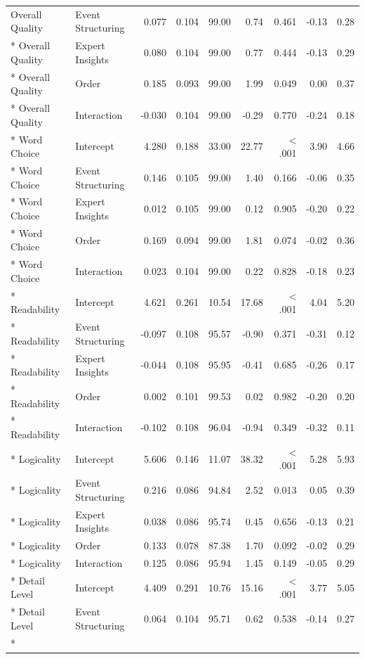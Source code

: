 \begin{longtable}{l l r r r r r r r}
Overall Quality & Event Structuring & 0.077 & 0.104 & 99.00 & 0.74 & 0.461 & -0.13 & 0.28\\*
Overall Quality & Expert Insights & 0.080 & 0.104 & 99.00 & 0.77 & 0.444 & -0.13 & 0.29\\*
Overall Quality & Order & 0.185 & 0.093 & 99.00 & 1.99 & 0.049 & 0.00 & 0.37\\*
Overall Quality & Interaction & -0.030 & 0.104 & 99.00 & -0.29 & 0.770 & -0.24 & 0.18\\*
Word Choice & Intercept & 4.280 & 0.188 & 33.00 & 22.77 & < .001 & 3.90 & 4.66\\*
Word Choice & Event Structuring & 0.146 & 0.105 & 99.00 & 1.40 & 0.166 & -0.06 & 0.35\\*
Word Choice & Expert Insights & 0.012 & 0.105 & 99.00 & 0.12 & 0.905 & -0.20 & 0.22\\*
Word Choice & Order & 0.169 & 0.094 & 99.00 & 1.81 & 0.074 & -0.02 & 0.36\\*
Word Choice & Interaction & 0.023 & 0.104 & 99.00 & 0.22 & 0.828 & -0.18 & 0.23\\*
Readability & Intercept & 4.621 & 0.261 & 10.54 & 17.68 & < .001 & 4.04 & 5.20\\*
Readability & Event Structuring & -0.097 & 0.108 & 95.57 & -0.90 & 0.371 & -0.31 & 0.12\\*
Readability & Expert Insights & -0.044 & 0.108 & 95.95 & -0.41 & 0.685 & -0.26 & 0.17\\*
Readability & Order & 0.002 & 0.101 & 99.53 & 0.02 & 0.982 & -0.20 & 0.20\\*
Readability & Interaction & -0.102 & 0.108 & 96.04 & -0.94 & 0.349 & -0.32 & 0.11\\*
Logicality & Intercept & 5.606 & 0.146 & 11.07 & 38.32 & < .001 & 5.28 & 5.93\\*
Logicality & Event Structuring & 0.216 & 0.086 & 94.84 & 2.52 & 0.013 & 0.05 & 0.39\\*
Logicality & Expert Insights & 0.038 & 0.086 & 95.74 & 0.45 & 0.656 & -0.13 & 0.21\\*
Logicality & Order & 0.133 & 0.078 & 87.38 & 1.70 & 0.092 & -0.02 & 0.29\\*
Logicality & Interaction & 0.125 & 0.086 & 95.94 & 1.45 & 0.149 & -0.05 & 0.29\\*
Detail Level & Intercept & 4.409 & 0.291 & 10.76 & 15.16 & < .001 & 3.77 & 5.05\\*
Detail Level & Event Structuring & 0.064 & 0.104 & 95.71 & 0.62 & 0.538 & -0.14 & 0.27\\*

\end{longtable}
